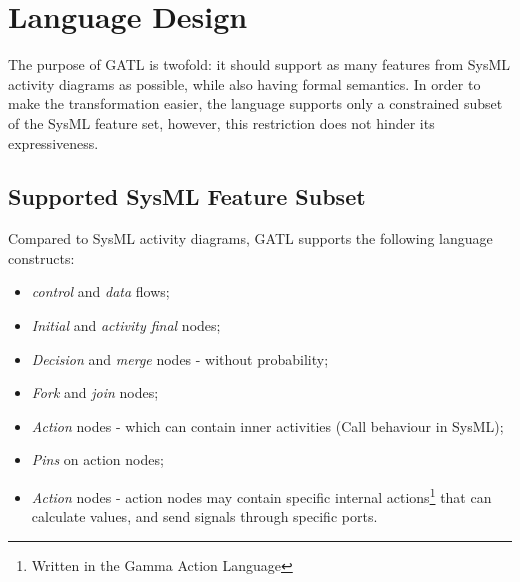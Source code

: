 \section{Language Design}

The purpose of GATL is twofold: it should support as many features from SysML activity diagrams as possible, while also having formal semantics. In order to make the transformation easier, the language supports only a constrained subset of the SysML feature set, however, this restriction does not hinder its expressiveness.

\subsection{Supported SysML Feature Subset}

Compared to SysML activity diagrams, GATL supports the following language constructs:

\begin{itemize}
	\item \emph{control} and \emph{data} flows;
	\item \emph{Initial} and \emph{activity final} nodes;
	\item \emph{Decision} and \emph{merge} nodes - without probability;
	\item \emph{Fork} and \emph{join} nodes;
	\item \emph{Action} nodes - which can contain inner activities (Call behaviour in SysML);
	\item \emph{Pins} on action nodes;
	\item \emph{Action} nodes - action nodes may contain specific internal actions\footnote{Written in the Gamma Action Language} that can calculate values, and send signals through specific ports.
\end{itemize}

